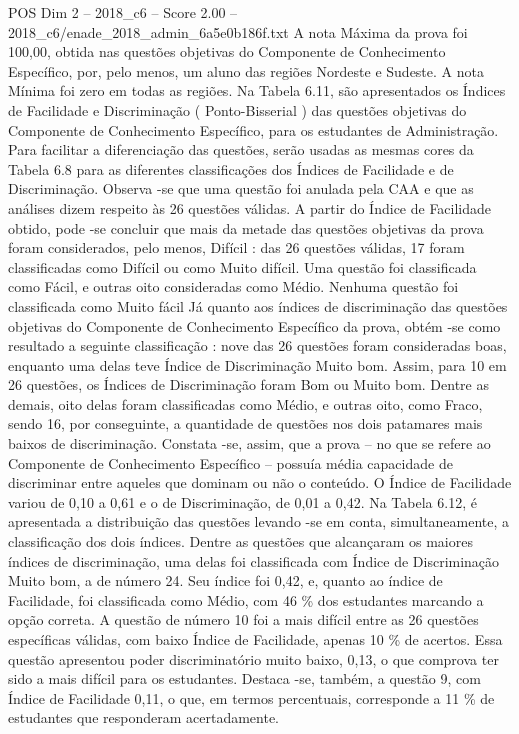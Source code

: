 \begin{textsample}{POS Dim 2 – 2018\_c6 – Score 2.00 – 2018\_c6/enade\_2018\_admin\_6a5e0b186f.txt}
A nota Máxima da prova foi 100,00, obtida nas questões objetivas do Componente de Conhecimento Específico, por, pelo menos, um aluno das regiões Nordeste e Sudeste.
A nota Mínima foi zero em todas as regiões.
Na Tabela 6.11, são apresentados os Índices de Facilidade e Discriminação ( Ponto-Bisserial ) das questões objetivas do Componente de Conhecimento Específico, para os estudantes de Administração.
Para facilitar a diferenciação das questões, serão usadas as mesmas cores da Tabela 6.8 para as diferentes classificações dos Índices de Facilidade e de Discriminação.
Observa -se que uma questão foi anulada pela CAA e que as análises dizem respeito às 26 questões válidas.
A partir do Índice de Facilidade obtido, pode -se concluir que mais da metade das questões objetivas da prova foram considerados, pelo menos, Difícil : das 26 questões válidas, 17 foram classificadas como Difícil ou como Muito difícil.
Uma questão foi classificada como Fácil, e outras oito consideradas como Médio.
Nenhuma questão foi classificada como Muito fácil Já quanto aos índices de discriminação das questões objetivas do Componente de Conhecimento Específico da prova, obtém -se como resultado a seguinte classificação : nove das 26 questões foram consideradas boas, enquanto uma delas teve Índice de Discriminação Muito bom.
Assim, para 10 em 26 questões, os Índices de Discriminação foram Bom ou Muito bom.
Dentre as demais, oito delas foram classificadas como Médio, e outras oito, como Fraco, sendo 16, por conseguinte, a quantidade de questões nos dois patamares mais baixos de discriminação.
Constata -se, assim, que a prova – no que se refere ao Componente de Conhecimento Específico – possuía média capacidade de discriminar entre aqueles que dominam ou não o conteúdo.
O Índice de Facilidade variou de 0,10 a 0,61 e o de Discriminação, de 0,01 a 0,42.
Na Tabela 6.12, é apresentada a distribuição das questões levando -se em conta, simultaneamente, a classificação dos dois índices.
Dentre as questões que alcançaram os maiores índices de discriminação, uma delas foi classificada com Índice de Discriminação Muito bom, a de número 24.
Seu índice foi 0,42, e, quanto ao índice de Facilidade, foi classificada como Médio, com 46 \% dos estudantes marcando a opção correta.
A questão de número 10 foi a mais difícil entre as 26 questões específicas válidas, com baixo Índice de Facilidade, apenas 10 \% de acertos.
Essa questão apresentou poder discriminatório muito baixo, 0,13, o que comprova ter sido a mais difícil para os estudantes.
Destaca -se, também, a questão 9, com Índice de Facilidade 0,11, o que, em termos percentuais, corresponde a 11 \% de estudantes que responderam acertadamente.

\end{textsample}
